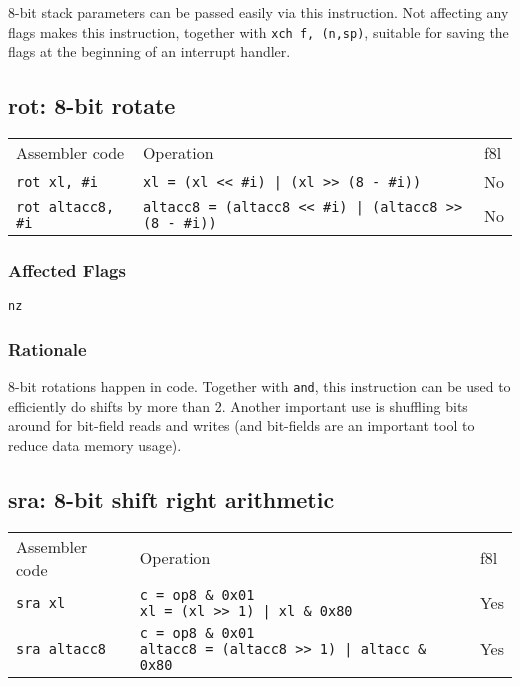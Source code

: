 \documentclass{book}
\begin{document}
8-bit stack parameters can be passed easily via this instruction. Not affecting any flags makes this instruction, together with \texttt{xch f, (n,sp)}, suitable for saving the flags at the beginning of an interrupt handler.

\subsection{rot: 8-bit rotate}

\begin{tabular}{l l l}
Assembler code            & Operation                                                    & f8l \\
\texttt{rot xl, \#i}      & \texttt{xl = (xl << \#i) | (xl >> (8 - \#i))}                & No \\
\texttt{rot altacc8, \#i} & \texttt{altacc8 = (altacc8 << \#i) | (altacc8 >> (8 - \#i))} & No \\
\end{tabular}

\subsubsection*{Affected Flags}

\texttt{nz}

\subsubsection*{Rationale}

8-bit rotations happen in code. Together with \texttt{and}, this instruction can be used to efficiently do shifts by more than 2. Another important use is shuffling bits around for bit-field reads and writes (and bit-fields are an important tool to reduce data memory usage).


\subsection{sra: 8-bit shift right arithmetic}

\begin{tabular}{l l l}
Assembler code       & Operation                                                                               & f8l \\
\texttt{sra xl}      & \makecell{\texttt{c = op8 \& 0x01}\\\texttt{xl = (xl >> 1) | xl \& 0x80}}               & Yes \\
\texttt{sra altacc8} & \makecell{\texttt{c = op8 \& 0x01}\\\texttt{altacc8 = (altacc8 >> 1) | altacc \& 0x80}} & Yes
\end{tabular}
\end{document}

